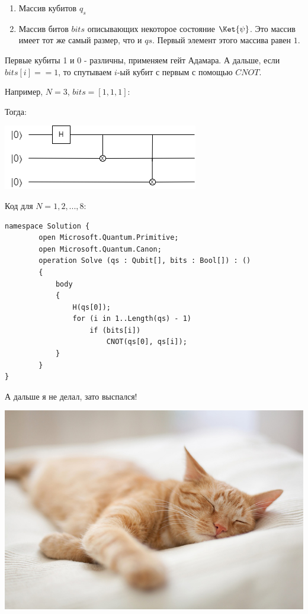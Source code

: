 \documentclass[a4paper,12pt]{article}
\begin{document}
\begin{enumerate}
    \item Массив кубитов $q_s$
    \item Массив битов $bits$ описывающих некоторое состояние $\Ket{\psi}$. Это массив имеет тот же самый размер, что и $qs$. Первый элемент этого массива равен $1$.
\end{enumerate}

Первые кубиты 1 и 0 - различны, применяем гейт Адамара. А дальше, если $bits[i] == 1$, то спутываем $i$-ый кубит с первым с помощью $CNOT$.

Например, $N = 3$, $bits = [1, 1, 1]$:

Тогда:

\begin{center}
    \includegraphics[scale=0.7]{img/3_1_1.png}
\end{center}

Код для $N = 1, 2, ..., 8$:
\begin{lstlisting}
namespace Solution {
        open Microsoft.Quantum.Primitive;
        open Microsoft.Quantum.Canon;
        operation Solve (qs : Qubit[], bits : Bool[]) : ()
        {
            body
            {
                H(qs[0]);
                for (i in 1..Length(qs) - 1)
                    if (bits[i])
                        CNOT(qs[0], qs[i]);
            }
        }
}
\end{lstlisting}

\begin{center}
    А дальше я не делал, зато выспался!

    \includegraphics[scale=0.4]{img/cat_sleeps.jpg}
\end{center}
\end{document}
